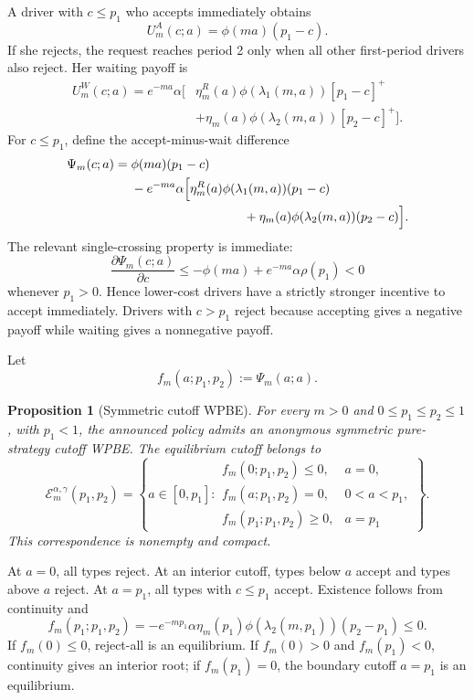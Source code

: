 \documentclass[11pt]{article}
\newtheorem{proposition}{Proposition}
\theoremstyle{definition}
\theoremstyle{remark}
\newcommand{\calE}{\mathcal E}
\begin{document}
A driver with \(c\le p_1\) who accepts immediately obtains
\[
  U_m^A(c;a)=\phi(ma)(p_1-c).
\]
If she rejects, the request reaches period 2 only when all other first-period
drivers also reject.  Her waiting payoff is
\[
\begin{aligned}
U_m^W(c;a)
=e^{-ma}\alpha\Big[
&\eta_m^R(a)\phi(\lambda_1(m,a))[p_1-c]^+\\
&+\eta_m(a)\phi(\lambda_2(m,a))[p_2-c]^+
\Big].
\end{aligned}
\]
For \(c\le p_1\), define the accept-minus-wait difference
\[
\begin{aligned}
\Psi_m(c;a)
={}&\phi(ma)(p_1-c)\\
&-e^{-ma}\alpha\Big[
\eta_m^R(a)\phi(\lambda_1(m,a))(p_1-c)\\
&\hspace{31mm}
+\eta_m(a)\phi(\lambda_2(m,a))(p_2-c)
\Big].
\end{aligned}
\]
The relevant single-crossing property is immediate:
\[
  \frac{\partial\Psi_m(c;a)}{\partial c}
  \le
  -\phi(ma)+e^{-ma}\alpha\rho(p_1)<0
\]
whenever \(p_1>0\).  Hence lower-cost drivers have a strictly stronger
incentive to accept immediately.  Drivers with \(c>p_1\) reject because
accepting gives a negative payoff while waiting gives a nonnegative payoff.

Let
\[
  f_m(a;p_1,p_2):=\Psi_m(a;a).
\]

\begin{proposition}[Symmetric cutoff WPBE]
\label{prop:wpbe}
For every \(m>0\) and \(0\le p_1\le p_2\le1\), with \(p_1<1\), the announced
policy admits an anonymous symmetric pure-strategy cutoff WPBE.  The equilibrium
cutoff belongs to
\[
\calE_m^{\alpha,\gamma}(p_1,p_2)
=
\left\{
a\in[0,p_1]:
\begin{array}{ll}
f_m(0;p_1,p_2)\le0, & a=0,\\
f_m(a;p_1,p_2)=0, & 0<a<p_1,\\
f_m(p_1;p_1,p_2)\ge0, & a=p_1
\end{array}
\right\}.
\]
This correspondence is nonempty and compact.
\end{proposition}

At \(a=0\), all types reject.  At an interior cutoff, types below \(a\)
accept and types above \(a\) reject.  At \(a=p_1\), all types with
\(c\le p_1\) accept.  Existence follows from continuity and
\[
  f_m(p_1;p_1,p_2)
  =
  -e^{-mp_1}\alpha\eta_m(p_1)
   \phi(\lambda_2(m,p_1))(p_2-p_1)
  \le0.
\]
If \(f_m(0)\le0\), reject-all is an equilibrium.  If \(f_m(0)>0\) and
\(f_m(p_1)<0\), continuity gives an interior root; if \(f_m(p_1)=0\), the
boundary cutoff \(a=p_1\) is an equilibrium.
\end{document}
